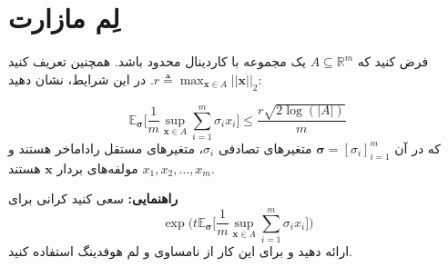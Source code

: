 \section
[لم مازارت]
{لِم مازارت}
فرض کنید که
$A \subseteq \mathbb{R}^m$
 یک مجموعه با کاردینال محدود باشد. همچنین تعریف کنید 
 $r \triangleq \max_{\mathbf{x}\in A} ||\mathbf{x}||_2$.
 در این شرایط، نشان دهید:
 
 $$\mathbb{E}_\mathbf{\sigma}\Big[\frac{1}{m}\sup_{\mathbf{x}\in A}\sum_{i = 1}^{m}\sigma_i x_i\Big] \leq \frac{r\sqrt{2\log(|A|)}}{m}$$
 که در آن 
 $\mathbf{\sigma} = [\sigma_i]_{i = 1}^m$
 متغیرهای تصادفی 
 $\sigma_i$،
 متغیرهای مستقل راداماخر هستند و
$x_1, x_2,\dots, x_m$
مولفه‌های بردار 
$\mathbf{x}$
هستند.

\vspace{0.5cm}
\textbf{راهنمایی:}
سعی کنید کرانی برای 
$$\exp\Big(t\mathbb{E}_\mathbf{\sigma}\Big[\frac{1}{m}\sup_{\mathbf{x}\in A}\sum_{i = 1}^{m}\sigma_i x_i\Big]\Big)$$
ارائه دهید و  برای این کار از نامساوی 
و لم هوفدینگ استفاده کنید.

